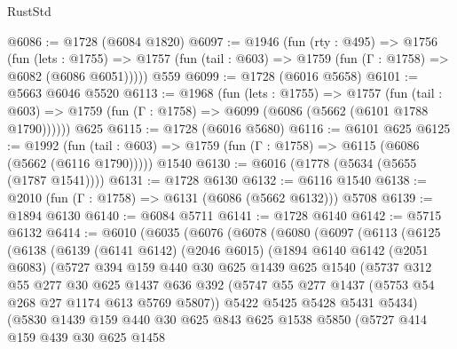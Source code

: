 \begin{lexlean}{RustStd}
\begin{coremodule}
{\begin{coremodule}
{{{{{{{{{{{{{@6086 := @1728 (@6084 @1820)
@6097 := @1946
    (fun (rty : @495) =>
    @1756
      (fun (lets : @1755) =>
      @1757 (fun (tail : @603) => @1759 (fun (Γ : @1758) => @6082 (@6086 @6051)))))
    @559
@6099 := @1728 (@6016 @5658)
@6101 := @5663 @6046 @5520
@6113 := @1968
    (fun (lets : @1755) =>
    @1757
      (fun (tail : @603) => @1759 (fun (Γ : @1758) => @6099 (@6086 (@5662 (@6101 @1788 @1790))))))
    @625
@6115 := @1728 (@6016 @5680)
@6116 := @6101 @625
@6125 := @1992
    (fun (tail : @603) => @1759 (fun (Γ : @1758) => @6115 (@6086 (@5662 (@6116 @1790)))))
    @1540
@6130 := @6016 (@1778 (@5634 (@5655 (@1787 @1541))))
@6131 := @1728 @6130
@6132 := @6116 @1540
@6138 := @2010 (fun (Γ : @1758) => @6131 (@6086 (@5662 @6132))) @5708
@6139 := @1894 @6130
@6140 := @6084 @5711
@6141 := @1728 @6140
@6142 := @5715 @6132
@6414 := @6010
    (@6035
      (@6076
        (@6078
          (@6080
            (@6097
              (@6113
                (@6125
                  (@6138
                    (@6139
                      (@6141 @6142)
                      (@2046 @6015)
                      (@1894
                        @6140
                        @6142
                        (@2051 @6083)
                        (@5727
                          @394
                          @159
                          @440
                          @30
                          @625
                          @1439
                          @625
                          @1540
                          (@5737
                            @312
                            @55
                            @277
                            @30
                            @625
                            @1437
                            @636
                            @392
                            (@5747 @55 @277 @1437 (@5753 @54 @268 @27 @1174 @613 @5769 @5807))
                            @5422
                            @5425
                            @5428
                            @5431
                            @5434)
                          (@5830
                            @1439
                            @159
                            @440
                            @30
                            @625
                            @843
                            @625
                            @1538
                            @5850
                            (@5727
                              @414
                              @159
                              @439
                              @30
                              @625
                              @1458
}}}}}}}}}}}}}
\end{coremodule}}
\end{coremodule}
\end{lexlean}
